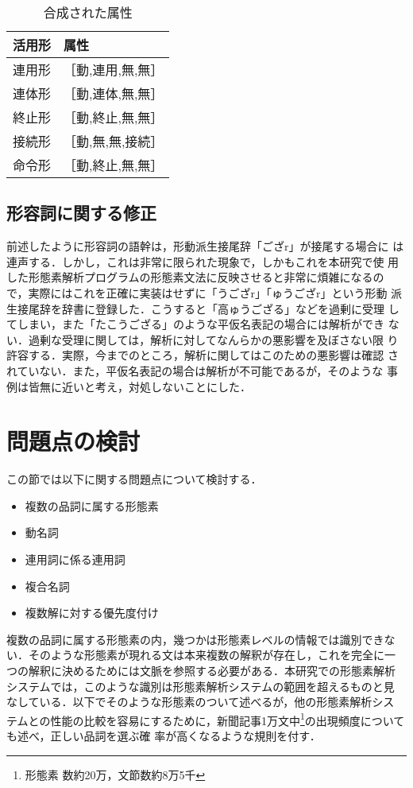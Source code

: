 \begin{table}
\begin{center}
\begin{tabular}{|l|l|} \hline
活用形 & 属性 \\ \hline
連用形 &［動,連用,無,無］ \\
連体形 & ［動,連体,無,無］\\
終止形 & ［動,終止,無,無］\\
接続形 & ［動,無,無,接続］\\
命令形 & ［動,終止,無,無］ \\
\hline
\end{tabular}
\end{center}
\caption{合成された属性}
\label{gousei}
\end{table}


\subsection{形容詞に関する修正}

前述したように形容詞の語幹は，形動派生接尾辞「ござr」が接尾する場合に
は連声する．しかし，これは非常に限られた現象で，しかもこれを本研究で使
用した形態素解析プログラムの形態素文法に反映させると非常に煩雑になるの
で，実際にはこれを正確に実装はせずに「うござr」「ゅうござr」という形動
派生接尾辞を辞書に登録した．こうすると「高ゅうござる」などを過剰に受理
してしまい，また「たこうござる」のような平仮名表記の場合には解析ができ
ない．過剰な受理に関しては，解析に対してなんらかの悪影響を及ぼさない限
り許容する．実際，今までのところ，解析に関してはこのための悪影響は確認
されていない．また，平仮名表記の場合は解析が不可能であるが，そのような
事例は皆無に近いと考え，対処しないことにした．


\section{問題点の検討} \label{detail}
この節では以下に関する問題点について検討する．
\begin{itemize}
\item 複数の品詞に属する形態素
\item 動名詞
\item 連用詞に係る連用詞
\item 複合名詞
\item 複数解に対する優先度付け
\end{itemize}
複数の品詞に属する形態素の内，幾つかは形態素レベルの情報では識別できな
い．そのような形態素が現れる文は本来複数の解釈が存在し，これを完全に一
つの解釈に決めるためには文脈を参照する必要がある．本研究での形態素解析
システムでは，このような識別は形態素解析システムの範囲を超えるものと見
なしている．以下でそのような形態素のついて述べるが，他の形態素解析シス
テムとの性能の比較を容易にするために，新聞記事1万文中\footnote{形態素
数約20万，文節数約8万5千}の出現頻度についても述べ，正しい品詞を選ぶ確
率が高くなるような規則を付す．

